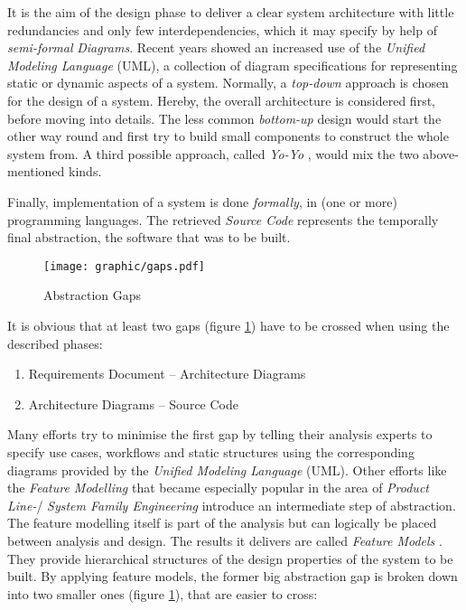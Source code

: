 It is the aim of the design phase to deliver a clear system architecture with
little redundancies and only few interdependencies, which it may specify by
help of \emph{semi-formal} \emph{Diagrams}. Recent years showed an increased
use of the \emph{Unified Modeling Language} (UML), a collection of diagram
specifications for representing static or dynamic aspects of a system.
Normally, a \emph{top-down} approach is chosen for the design of a system.
Hereby, the overall architecture is considered first, before moving into
details. The less common \emph{bottom-up} design would start the other way
round and first try to build small components to construct the whole system
from. A third possible approach, called \emph{Yo-Yo} \cite{buschmann}, would
mix the two above-mentioned kinds.

Finally, implementation of a system is done \emph{formally}, in (one or more)
programming languages. The retrieved \emph{Source Code} represents the
temporally final abstraction, the software that was to be built.

\begin{figure}[ht]
    \begin{center}
        \texttt{[image: graphic/gaps.pdf]}
        \caption{Abstraction Gaps}
        \label{gaps_figure}
    \end{center}
\end{figure}

It is obvious that at least two gaps (figure \ref{gaps_figure}) have to be
crossed when using the described phases:

\begin{enumerate}
    \item Requirements Document -- Architecture Diagrams
    \item Architecture Diagrams -- Source Code
\end{enumerate}

Many efforts try to minimise the first gap by telling their analysis experts
to specify use cases, workflows and static structures using the corresponding
diagrams provided by the \emph{Unified Modeling Language} (UML). Other efforts
like the \emph{Feature Modelling} that became especially popular in the area of
\emph{Product Line-}/ \emph{System Family Engineering} \cite{boellert} introduce
an intermediate step of abstraction. The feature modelling itself is part of the
analysis but can logically be placed between analysis and design. The results it
delivers are called \emph{Feature Models} \cite{streitferdt, pashov}. They
provide hierarchical structures of the design properties of the system to be
built. By applying feature models, the former big abstraction gap is broken down
into two smaller ones (figure \ref{gaps_figure}), that are easier to cross:

